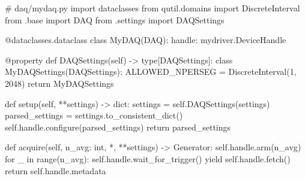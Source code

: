 \begin{listing}[htpb]
    \begin{pycode}
        # daq/mydaq.py
        import dataclasses
        from qutil.domains import DiscreteInterval
        from .base import DAQ
        from .settings import DAQSettings

        @dataclasses.dataclass
        class MyDAQ(DAQ):
            handle: mydriver.DeviceHandle

            @property
            def DAQSettings(self) -> type[DAQSettings]:
                class MyDAQSettings(DAQSettings):
                    ALLOWED_NPERSEG = DiscreteInterval(1, 2048)
                return MyDAQSettings

            def setup(self, **settings) -> dict:
                settings = self.DAQSettings(settings)
                parsed_settings = settings.to_consistent_dict()
                self.handle.configure(parsed_settings)
                return parsed_settings

            def acquire(self, n_avg: int, *, **settings) -> Generator:
                self.handle.arm(n_avg)
                for _ in range(n_avg):
                    self.handle.wait_for_trigger()
                    yield self.handle.fetch()
                return self.handle.metadata
    \end{pycode}
    \caption{
        Exemplary code for a  implementation of some instrument with given driver class  in the package .
        The  class is instantiated with a  instance.
        Optionally, the  property can be overridden to implement hardware constraints or default values for data acquisition parameters.
        For this, the  module provides several classes that represent bounded domains and sets.
        The  method parses the given acquisition settings and configures the instrument through the external driver interface .
        The  method arms the instrument (if necessary) and loops over the number of outer averages, .
        In the body of the loop, it can wait for external triggers (or send software triggers) before yielding a batch of data fetched from the external driver interface.
        Once acquisition is done, the method can return arbitrary metadata to the  object to attach to the stored data.
    }
    \label{lst:speck:daq:pseudocode}
\end{listing}

